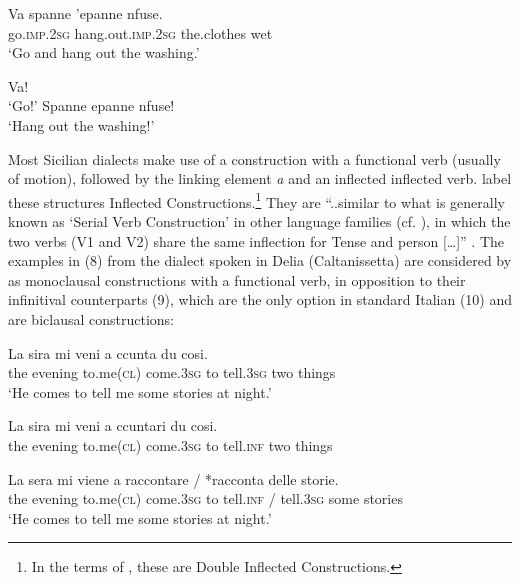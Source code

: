 \documentclass[output=paper]{langsci/langscibook}
\begin{document}
\ea%
    \label{ex:lorusso:6}
    \gll Va     spanne     'epanne  nfuse.\\
         go.\textsc{imp.2sg} hang.out.\textsc{imp.2sg}  the.clothes  wet\\
    \glt ‘Go and hang out the washing.’ \citep[230]{Ledgeway1997}
    \z

\ea%
    \label{ex:lorusso:7}
    \ea   Va!\\
    \glt  ‘Go!’
    \ex   Spanne epanne nfuse!\\
    \glt  ‘Hang out the washing!’ \citep[231]{Ledgeway1997}
    \z
\z

Most Sicilian dialects make use of a construction with a functional verb (usually of motion), followed by the linking element \textit{a} and an inflected inflected verb. \citet{Cardinaletti2001,Cardinaletti2003} label these structures Inflected Constructions.\footnote{In the terms of \citet{Cruschina2013}, these are Double Inflected Constructions.} They are “..similar to what is generally known as ‘Serial Verb Construction’ in other language families (cf. \citealt{Aikhenvald2006}), in which the two verbs (V1 and V2) share the same inflection for Tense and person […]” \citep[392]{Di2015}. The examples in (8) from the dialect spoken in Delia (Caltanissetta) are considered by \citet{Di2015} as monoclausal constructions with a functional verb, in opposition to their infinitival counterparts (9), which are the only option in standard Italian (10) and are biclausal constructions:

\ea%
    \label{ex:lorusso:8}
    \gll La  sira    mi    veni    a  ccunta    du   cosi.\\
         the  evening  to.me\textsc{(cl)}  come.\textsc{3sg}  to tell.\textsc{3sg} two  things\\
    \glt ‘He comes to tell me some stories at night.’
    \z


\ea%
    \label{ex:lorusso:9}
    \gll La  sira    mi    veni     a  ccuntari  du   cosi. \\
         the  evening  to.me\textsc{(cl)}  come.\textsc{3sg}  to  tell.\textsc{inf} two  things\\
    \z



\ea%
    \label{ex:lorusso:10}
    \gll La  sera    mi    viene     a   raccontare / *racconta  delle  storie.\\
         the  evening  to.me\textsc{(cl)} come.\textsc{3sg}  to  tell.\textsc{inf} / tell.\textsc{3sg}  some  stories\\
    \glt ‘He comes to tell me some stories at night.’ \citep{Di2015}
    \z
\end{document}
